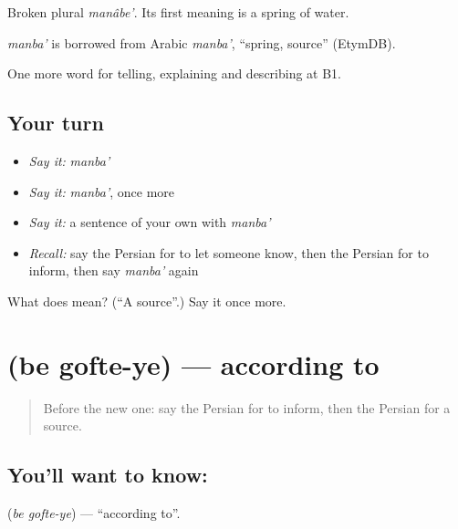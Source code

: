 Broken plural \emph{manâbe'}. Its first meaning is a spring of water.

\begin{cousinweb}
\emph{manba'} is borrowed from Arabic \emph{manba'}, \textquotedblleft{}spring, source\textquotedblright{} (EtymDB).
\end{cousinweb}

\begin{grammarlens}[title={What you've built}]
One more word for telling, explaining and describing at B1.
\end{grammarlens}

\subsection*{Your turn}
\begin{itemize}
\raggedright
  \item \emph{Say it:} \emph{manba'}
  \item \emph{Say it:} \emph{manba'}, once more
  \item \emph{Say it:} a sentence of your own with \emph{manba'}
  \item \emph{Recall:} say the Persian for to let someone know, then the Persian for to inform, then say \emph{manba'} again
\end{itemize}

\begin{tcolorbox}[breakable,colback=teal!4,colframe=teal!35!black,title={Before you move on}]
What does  mean? (\textquotedblleft{}A source\textquotedblright{}.) Say it once more.
\end{tcolorbox}
\section[\texorpdfstring{\fa{به} \fa{گفته} (be gofte-ye)}{به گفته (be gofte-ye)}]{  (be gofte-ye) — according to}

\label{lesson:FA-C311-be-gofte}



\begin{quote}
Before the new one: say the Persian for to inform, then the Persian for a source.
\end{quote}

\subsection*{You'll want to know:  }
\textbf{ } (\emph{be gofte-ye}) — \textquotedblleft{}according to\textquotedblright{}.

